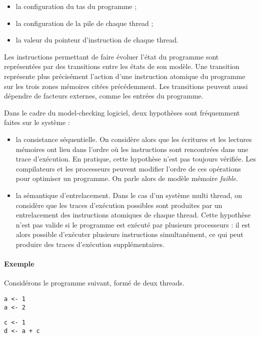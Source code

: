 \begin{itemize}
\item
  la configuration du tas du programme ;
\item
  la configuration de la pile de chaque thread ;
\item
  la valeur du pointeur d'instruction de chaque thread.
\end{itemize}

Les instructions permettant de faire évoluer l'état du programme sont
représentées par des transitions entre les états de son modèle. Une transition
représente plus précisément l'action d'une instruction atomique du programme sur
les trois zones mémoires citées précédemment. Les transitions peuvent aussi
dépendre de facteurs externes, comme les entrées du programme.

Dans le cadre du model-checking logiciel, deux hypothèses sont fréquemment
faites sur le système :

\begin{itemize}
\item
  la consistance séquentielle. On considère alors que les écritures et
  les lectures mémoires ont lieu dans l'ordre où les instructions sont
  rencontrées dans une trace d'exécution. En pratique, cette hypothèse
  n'est pas toujours vérifiée. Les compilateurs et les processeurs
  peuvent modifier l'ordre de ces opérations pour optimiser un
  programme. On parle alors de modèle mémoire \emph{faible}.
\item
  la sémantique d'entrelacement. Dans le cas d'un système multi thread,
  on considère que les traces d'exécution possibles sont produites par
  un entrelacement des instructions atomiques de chaque thread. Cette
  hypothèse n'est pas valide si le programme est exécuté par plusieurs
  processeurs : il est alors possible d'exécuter plusieurs instructions
  simultanément, ce qui peut produire des traces d'exécution
  supplémentaires.
\end{itemize}

\paragraph{Exemple}

Considérons le programme suivant, formé de deux threads.

\noindent\begin{minipage}{.45\textwidth}
\begin{lstlisting}[caption=Thread 1, frame=tlrb]
a <- 1
a <- 2
\end{lstlisting}
\end{minipage}\hfill
\begin{minipage}{.45\textwidth}
\begin{lstlisting}[caption=Thread 2,frame=tlrb]
c <- 1
d <- a + c
\end{lstlisting}
\end{minipage}

